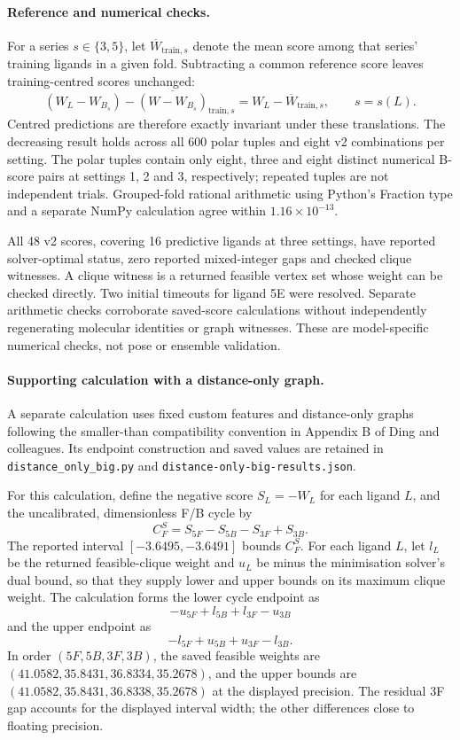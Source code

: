 \documentclass{article}
\begin{document}
\paragraph{Reference and numerical checks.}
For a series \(s\in\{3,5\}\), let \(\overline W_{\mathrm{train},s}\) denote the mean score among that series' training ligands in a given fold. Subtracting a common reference score leaves training-centred scores unchanged:
\[
 (W_L-W_{B_s})
 -\overline{(W-W_{B_s})}_{\mathrm{train},s}
 =W_L-\overline W_{\mathrm{train},s},
 \qquad s=s(L).
\]
Centred predictions are therefore exactly invariant under these translations. The decreasing result holds across all 600 polar tuples and eight v2 combinations per setting. The polar tuples contain only eight, three and eight distinct numerical B-score pairs at settings 1, 2 and 3, respectively; repeated tuples are not independent trials. Grouped-fold rational arithmetic using Python's Fraction type and a separate NumPy calculation agree within \(1.16\times10^{-13}\).

All 48 v2 scores, covering 16 predictive ligands at three settings, have reported solver-optimal status, zero reported mixed-integer gaps and checked clique witnesses. A clique witness is a returned feasible vertex set whose weight can be checked directly. Two initial timeouts for ligand 5E were resolved. Separate arithmetic checks corroborate saved-score calculations without independently regenerating molecular identities or graph witnesses. These are model-specific numerical checks, not pose or ensemble validation.

\paragraph{Supporting calculation with a distance-only graph.}
A separate calculation uses fixed custom features and distance-only graphs following the smaller-than compatibility convention in Appendix B of Ding and colleagues. Its endpoint construction and saved values are retained in \texttt{distance\_only\_big.py} and \texttt{distance-only-big-results.json}.

For this calculation, define the negative score \(S_L=-W_L\) for each ligand \(L\), and the uncalibrated, dimensionless F/B cycle by
\[
 C_F^S=S_{5F}-S_{5B}-S_{3F}+S_{3B}.
\]
The reported interval \([-3.6495,-3.6491]\) bounds \(C_F^S\). For each ligand \(L\), let \(l_L\) be the returned feasible-clique weight and \(u_L\) be minus the minimisation solver's dual bound, so that they supply lower and upper bounds on its maximum clique weight. The calculation forms the lower cycle endpoint as
\[
 -u_{5F}+l_{5B}+l_{3F}-u_{3B}
\]
and the upper endpoint as
\[
 -l_{5F}+u_{5B}+u_{3F}-l_{3B}.
\]
In order \((5F,5B,3F,3B)\), the saved feasible weights are \((41.0582,35.8431,36.8334,35.2678)\), and the upper bounds are \((41.0582,35.8431,36.8338,35.2678)\) at the displayed precision. The residual 3F gap accounts for the displayed interval width; the other differences close to floating precision.
\end{document}
